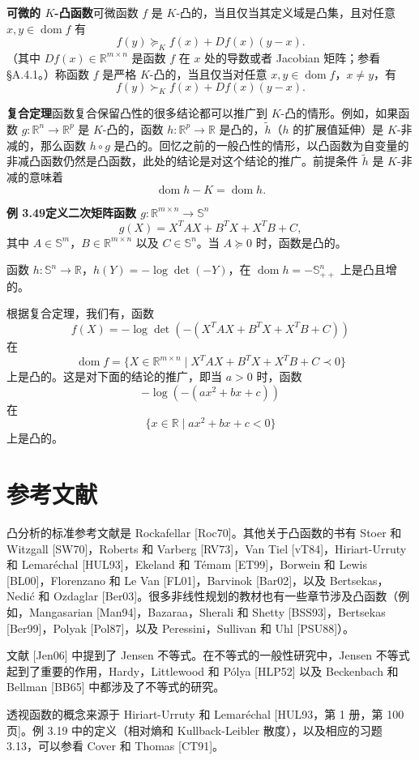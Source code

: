 \documentclass[UTF8,12pt,a4paper,fontset=fandol]{ctexart}
\DeclareMathOperator{\dom}{dom}
\begin{document}
\noindent\textbf{可微的 $K$-凸函数}\quad 可微函数 $f$ 是 $K$-凸的，当且仅当其定义域是凸集，且对任意 $x,y\in\dom f$ 有
\[
f(y)\succeq_K f(x)+Df(x)(y-x).
\]
（其中 $Df(x)\in\mathbb{R}^{m\times n}$ 是函数 $f$ 在 $x$ 处的导数或者 Jacobian 矩阵；参看 \S A.4.1。）称函数 $f$ 是严格 $K$-凸的，当且仅当对任意 $x,y\in\dom f$，$x\neq y$，有
\[
f(y)\succ_K f(x)+Df(x)(y-x).
\]

\noindent\textbf{复合定理}\quad 函数复合保留凸性的很多结论都可以推广到 $K$-凸的情形。例如，如果函数 $g:\mathbb{R}^n\to\mathbb{R}^p$ 是 $K$-凸的，函数 $h:\mathbb{R}^p\to\mathbb{R}$ 是凸的，$\tilde h$（$h$ 的扩展值延伸）是 $K$-非减的，那么函数 $h\circ g$ 是凸的。回忆之前的一般凸性的情形，以凸函数为自变量的非减凸函数仍然是凸函数，此处的结论是对这个结论的推广。前提条件 $\tilde h$ 是 $K$-非减的意味着
\[
\dom h-K=\dom h.
\]

\noindent\textbf{例 3.49\quad 定义二次矩阵函数 $g:\mathbb{R}^{m\times n}\to\mathbb{S}^n$}
\[
g(X)=X^TAX+B^TX+X^TB+C,
\]
其中 $A\in\mathbb{S}^m$，$B\in\mathbb{R}^{m\times n}$ 以及 $C\in\mathbb{S}^n$。当 $A\succeq0$ 时，函数是凸的。

函数 $h:\mathbb{S}^n\to\mathbb{R}$，$h(Y)=-\log\det(-Y)$，在 $\dom h=-\mathbb{S}_{++}^n$ 上是凸且增的。

根据复合定理，我们有，函数
\[
f(X)=-\log\det(-(X^TAX+B^TX+X^TB+C))
\]
在
\[
\dom f=\{X\in\mathbb{R}^{m\times n}\mid X^TAX+B^TX+X^TB+C\prec0\}
\]
上是凸的。这是对下面的结论的推广，即当 $a>0$ 时，函数
\[
-\log(-(ax^2+bx+c))
\]
在
\[
\{x\in\mathbb{R}\mid ax^2+bx+c<0\}
\]
上是凸的。

\section*{参考文献}

凸分析的标准参考文献是 Rockafellar [Roc70]。其他关于凸函数的书有 Stoer 和 Witzgall [SW70]，Roberts 和 Varberg [RV73]，Van Tiel [vT84]，Hiriart-Urruty 和 Lemaréchal [HUL93]，Ekeland 和 Témam [ET99]，Borwein 和 Lewis [BL00]，Florenzano 和 Le Van [FL01]，Barvinok [Bar02]，以及 Bertsekas，Nedić 和 Ozdaglar [Ber03]。很多非线性规划的教材也有一些章节涉及凸函数（例如，Mangasarian [Man94]，Bazaraa，Sherali 和 Shetty [BSS93]，Bertsekas [Ber99]，Polyak [Pol87]，以及 Peressini，Sullivan 和 Uhl [PSU88]）。

文献 [Jen06] 中提到了 Jensen 不等式。在不等式的一般性研究中，Jensen 不等式起到了重要的作用，Hardy，Littlewood 和 Pólya [HLP52] 以及 Beckenbach 和 Bellman [BB65] 中都涉及了不等式的研究。

透视函数的概念来源于 Hiriart-Urruty 和 Lemaréchal [HUL93，第 1 册，第 100 页]。例 3.19 中的定义（相对熵和 Kullback-Leibler 散度），以及相应的习题 3.13，可以参看 Cover 和 Thomas [CT91]。
\end{document}
